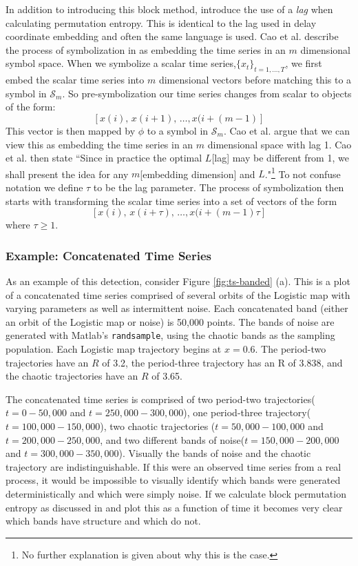 In addition to introducing this block method, \cite{cao2004det} introduce the use of a \emph{lag} when calculating permutation entropy. This is identical to the lag used in delay coordinate embedding and often the same language is used. Cao et al. describe the process of symbolization in \cite{bandt2002per} as embedding the time series in an $m$ dimensional symbol space. When we symbolize a scalar time series,$\{x_t\}_{t = 1,\dots,T}$, we first embed the scalar time series into $m$ dimensional vectors before matching this to a symbol in $\mathcal{S}_m$. So pre-symbolization our time series changes from scalar to objects of the form:  $$[x(i),\,x(i+1),\,\dots,x(i+(m-1)]$$ This vector is then mapped by $\phi$ to a symbol in $\mathcal{S}_m$. Cao et al. argue that we can view this as embedding the time series in an $m$ dimensional space with lag 1. Cao et al. then state ``Since in practice the optimal $L$[lag] may be different from 1, we shall present the idea for any $m$[embedding dimension] and $L$."\footnote{No further explanation is given about why this is the case.} To not confuse notation we define $\tau$ to be the lag parameter. The process of symbolization then starts with transforming the scalar time series into a set of vectors of the form $$[x(i),\,x(i+\tau),\,\dots,x(i+(m-1)\tau]$$ where $\tau\ge1$.

\subsubsection{Example: Concatenated Time Series}\label{sec:concatenate}
As an example of this detection, consider Figure \ref{fig:ts-banded} (a). This is a plot of a concatenated time series comprised of several orbits of the Logistic map with varying parameters as well as intermittent noise. Each concatenated band (either an orbit of the Logistic map or noise) is 50,000 points. The bands of noise are generated with Matlab's \verb|randsample|, using the chaotic bands as the sampling population. Each Logistic map trajectory begins at $x=0.6$. The period-two trajectories have an $R$ of 3.2, the period-three trajectory has an R of 3.838, and the chaotic trajectories have an $R$ of 3.65.

The concatenated time series is comprised of two period-two trajectories($t=0-50,000$ and $t=250,000-300,000$), one period-three trajectory($t=100,000-150,000$), two chaotic trajectories ($t=50,000-100,000$ and $t=200,000-250,000$, and two different bands of noise($t=150,000-200,000$ and $t=300,000-350,000$). Visually the bands of noise and the chaotic trajectory are indistinguishable. If this were an observed time series from a real process, it would be impossible to visually identify which bands were generated deterministically and which were simply noise. If we calculate block permutation entropy as discussed in \cite{cao2004det} and plot this as a function of time it becomes very clear which bands have structure and which do not.

